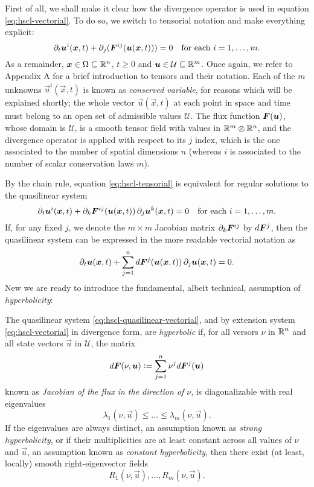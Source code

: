 First of all, we shall make it clear how the divergence operator
is used in equation \eqref{eq:hscl-vectorial}.
To do so, we switch to tensorial notation and make everything explicit:
\begin{equation} \label{eq:hscl-tensorial}
\partial_t \bm{u}^i(\bm{x},t) + \partial_j (\bm{F}^{ij}(\bm{u}(\bm{x},t))) = 0
\quad \text{for each $i = 1, \dots, m$.}
\end{equation}
As a remainder, $\bm{x} \in \Omega \subseteq \mathbb{R}^n$, $t \geq 0$ and
$\bm{u} \in \mathcal{U} \subseteq \mathbb{R}^m$.
Once again, we refer to Appendix A for a brief introduction
to tensors and their notation.
Each of the $m$ unknowns $\vec{u}^i(\vec{x},t)$ is known as
\emph{conserved variable}, for reasons which will be explained shortly;
the whole vector $\vec{u}(\vec{x},t)$ at each point in space and time must belong
to an open set of admissible values $\mathcal{U}$.
The flux function $\bm{F}(\bm{u})$, whose domain is $\mathcal{U}$,
is a smooth tensor field with values in $\mathbb{R}^m \otimes \mathbb{R}^n$,
and the divergence operator is applied with respect
to its $j$ index, which is the one associated to the number
of spatial dimensions $n$ (whereas $i$ is associated to the number of
scalar conservation laws $m$).

By the chain rule, equation \eqref{eq:hscl-tensorial} is equivalent
for regular solutions to the quasilinear system
\begin{equation} \label{eq:hscl-quasilinear-tensorial}
\partial_t \bm{u}^i(\bm{x},t)
+  \partial_k \bm{F}^{ij} (\bm{u}(\bm{x},t))
\, \partial_j \bm{u}^k (\bm{x},t) = 0
\quad \text{for each $i = 1, \dots, m$.}
\end{equation}
If, for any fixed $j$, we denote the $m \times m$ Jacobian matrix
$\partial_k \bm{F}^{ij}$ by $d\bm{F}^j$, then the quasilinear system
can be expressed in the more readable vectorial notation as
\begin{equation} \label{eq:hscl-quasilinear-vectorial}
\partial_t \bm{u}(\bm{x},t)
+ \sum_{j=1}^n d\bm{F}^j(\bm{u}(\bm{x},t))
\, \partial_j \bm{u}(\bm{x},t) = 0.
\end{equation}
New we are ready to introduce the fundamental, albeit technical,
assumption of \emph{hyperbolicity}:

\begin{defi}
The quasilinear system \eqref{eq:hscl-quasilinear-vectorial},
and by extension system \eqref{eq:hscl-vectorial} in divergence form,
are \emph{hyperbolic} if, for all versors $\nu$ in $\mathbb{R}^n$ and all state
vectors $\vec{u}$ in $\mathcal{U}$, the matrix
\[
d\bm{F}(\nu,\bm{u}) \vcentcolon= \sum_{j=1}^n \nu^j d\bm{F}^j(\bm{u})
\]
known as \emph{Jacobian of the flux in the direction of $\nu$},
is diagonalizable with real eigenvalues
\[
\lambda_1(\nu,\vec{u}) \leq \dots \leq \lambda_m (\nu,\vec{u}).
\]
If the eigenvalues are always distinct, an assumption known as
\emph{strong hyperbolicity}, or if their multiplicities are at least
constant across all values of $\nu$ and $\vec{u}$, an assumption
known as \emph{constant hyperbolicity}, then there exist (at least,
locally) smooth right-eigenvector fields
\[
R_1(\nu,\vec{u}), \dots, R_m (\nu,\vec{u}).
\]
\end{defi}



